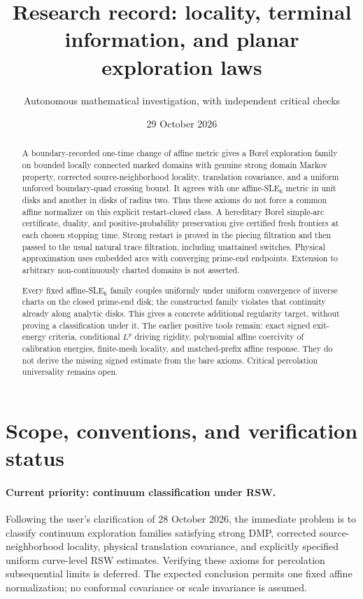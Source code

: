 \documentclass[11pt]{article}
\title{Research record: locality, terminal information, and planar exploration laws}
\author{Autonomous mathematical investigation, with independent critical checks}
\date{29 October 2026}
\theoremstyle{definition}\newtheorem{definition}[theorem]{Definition}
\theoremstyle{remark}\newtheorem{remark}[theorem]{Remark}
\begin{document}
\maketitle
\begin{abstract}
A boundary-recorded one-time change of affine metric gives a Borel exploration family on bounded locally connected marked domains with genuine strong domain Markov property, corrected source-neighborhood locality, translation covariance, and a uniform unforced boundary-quad crossing bound. It agrees with one affine-SLE$_6$ metric in unit disks and another in disks of radius two. Thus these axioms do not force a common affine normalizer on this explicit restart-closed class. A hereditary Borel simple-arc certificate, duality, and positive-probability preservation give certified fresh frontiers at each chosen stopping time. Strong restart is proved in the piecing filtration and then passed to the usual natural trace filtration, including unattained switches. Physical approximation uses embedded arcs with converging prime-end endpoints. Extension to arbitrary non-continuously charted domains is not asserted.

Every fixed affine-SLE$_6$ family couples uniformly under uniform convergence of inverse charts on the closed prime-end disk; the constructed family violates that continuity already along analytic disks. This gives a concrete additional regularity target, without proving a classification under it. The earlier positive tools remain: exact signed exit-energy criteria, conditional $L^p$ driving rigidity, polynomial affine coercivity of calibration energies, finite-mesh locality, and matched-prefix affine response. They do not derive the missing signed estimate from the bare axioms. Critical percolation universality remains open.
\end{abstract}
\tableofcontents

\section{Scope, conventions, and verification status}
\label{sec:scope}

\paragraph{Current priority: continuum classification under RSW.}
Following the user's clarification of 28 October 2026, the immediate
problem is to classify continuum exploration families satisfying strong
DMP, corrected source-neighborhood locality, physical translation
covariance, and explicitly specified uniform curve-level RSW estimates.
Verifying these axioms for percolation subsequential limits is deferred.
The expected conclusion permits one fixed affine normalization; no
conformal covariance or scale invariance is assumed.
\end{document}

